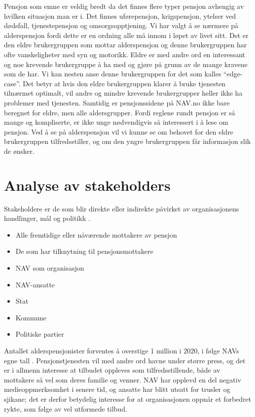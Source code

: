 \documentclass[informationsecurity]{gucmasterproject}
\begin{document}
Pensjon som emne er veldig bredt da det finnes flere typer pensjon avhengig av hvilken situasjon man er i. Det finnes uførepensjon, krigspensjon, ytelser ved dødsfall, tjenestepensjon og omsorgsopptjening. Vi har valgt å se nærmere på alderspensjon fordi dette er en ordning alle må innom i løpet av livet sitt. Det er den eldre brukergruppen som mottar alderspensjon og denne brukergruppen har ofte vanskeligheter med syn og motorikk. Eldre er med andre ord en interessant og noe krevende brukergruppe å ha med og gjøre på grunn av de mange kravene som de har. Vi kan nesten anse denne brukergruppen for det som kalles “edge-case”. Det betyr at hvis den eldre brukergruppen klarer å bruke tjenesten tilnærmet optimalt, vil andre og mindre krevende brukergrupper heller ikke ha problemer med tjenesten. Samtidig er pensjonssidene på NAV.no ikke bare beregnet for eldre, men alle aldersgrupper. Fordi reglene rundt pensjon er så mange og kompliserte, er ikke unge nødvendigvis så interessert i å lese om pensjon. Ved å se på alderspensjon vil vi kunne se om behovet for den eldre brukergruppen tilfredsstiller, og om den yngre brukergruppen får informasjon slik de ønsker.



\section{Analyse av stakeholders}
Stakeholdere er de som blir direkte eller indirekte påvirket av organisasjonens handlinger, mål og politikk \cite{stakeholder}.
\begin{itemize}
\item Alle fremtidige eller nåværende mottakere av pensjon
\item De som har tilknytning til pensjonsmottakere
\item NAV som organisasjon
\item NAV-ansatte
\item Stat
\item Kommune
\item Politiske partier
\end{itemize}

Antallet alderspensjonister forventes å overstige 1 million i 2020, i følge NAVs egne tall \cite{antallpassert}. Pensjonstjenesten vil med andre ord havne under større press, og det er i allmenn interesse at tilbudet oppleves som tilfredsstillende, både av mottakere så vel som deres familie og venner. NAV har opplevd en del negativ medieoppmerksomhet i senere tid, og ansatte har blitt utsatt for trusler og sjikane; det er derfor betydelig interesse for at organisasjonen oppnår et forbedret rykte, som følge av vel utformede tilbud.
\end{document}
